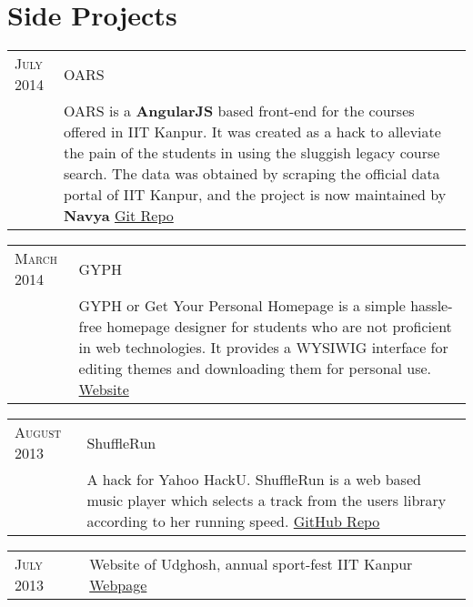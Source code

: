 \documentclass[a4paper,10pt]{article} %
\begin{document}
\section{Side Projects}

\begin{tabular}{p{2.2cm}|p{14cm}}
    \textsc{July 2014} & OARS\\
                       & \footnotesize{OARS is a \textbf{AngularJS} based front-end for the
                          courses offered in IIT Kanpur. It was created as a
                          hack to alleviate the pain of the students in using the
                          sluggish legacy course search. The data was obtained by
                          scraping the official data portal of IIT Kanpur, and the
                          project is now maintained by \textbf{Navya}
                          \href{https://github.com/navya/oars} {Git Repo} }\\

\end{tabular}

\begin{tabular}{p{2.2cm}|p{14cm}}
    \textsc{March 2014} & GYPH\\
                        & \footnotesize{GYPH or Get Your Personal Homepage
                           is a simple hassle-free homepage designer for students who are not
                           proficient in web technologies. It provides a WYSIWIG
                           interface for editing themes and downloading them for personal use.
                           \href{http://gyph2.herokuapp.com/} {Website} } \\
\end{tabular}

\begin{tabular}{p{2.2cm}|p{14cm}}
    \textsc{August 2013} & ShuffleRun\\
                         & \footnotesize{A hack for Yahoo HackU. ShuffleRun is a
                            web based music player which selects a track from the users library
                            according to her running speed.
                            \href{https://github.com/srijanshetty/ShuffleRun} {GitHub Repo} }\\
\end{tabular}

\begin{tabular}{p{2.2cm}|p{14cm}}
    \textsc{July 2013} & Website of Udghosh, annual sport-fest IIT Kanpur \footnotesize{\href{www.udghosh.org} {Webpage} } \\
\end{tabular}
\end{document}

